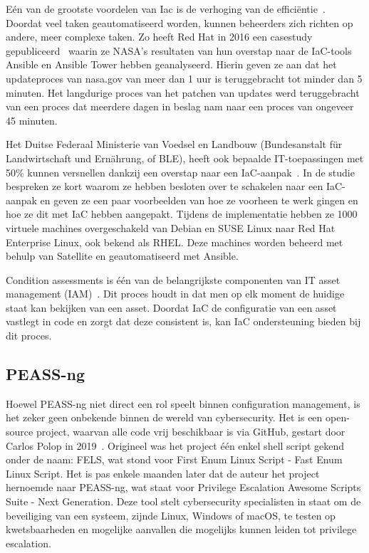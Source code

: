 E\'en van de grootste voordelen van Iac is de verhoging van de effici\"entie~\autocite{splunk-benefits-iac}.
Doordat veel taken geautomatiseerd worden, kunnen beheerders zich richten op andere, meer complexe taken.
Zo heeft Red Hat in 2016 een casestudy gepubliceerd~\autocite{case-study-nasa-iac} waarin ze NASA's resultaten van hun overstap naar de IaC-tools Ansible en Ansible Tower hebben geanalyseerd.
Hierin geven ze aan dat het updateproces van nasa.gov van meer dan 1 uur is teruggebracht tot minder dan 5 minuten.
Het langdurige proces van het patchen van updates werd teruggebracht van een proces dat meerdere dagen in beslag nam naar een proces van ongeveer 45 minuten.

Het Duitse Federaal Ministerie van Voedsel en Landbouw (Bundesanstalt f\"ur Landwirtschaft und Ern\"ahrung, of BLE), heeft ook bepaalde IT-toepassingen met 50\% kunnen versnellen dankzij een overstap naar een IaC-aanpak~\autocite{case-study-ble-iac}.
In de studie bespreken ze kort waarom ze hebben besloten over te schakelen naar een IaC-aanpak en geven ze een paar voorbeelden van hoe ze voorheen te werk gingen en hoe ze dit met IaC hebben aangepakt.
Tijdens de implementatie hebben ze 1000 virtuele machines overgeschakeld van Debian en SUSE Linux naar Red Hat Enterprise Linux, ook bekend als RHEL.
Deze machines worden beheerd met behulp van Satellite en geautomatiseerd met Ansible.

Condition assessments is één van de belangrijkste componenten van IT asset management (IAM)~\autocite{ibm-what-is-iam}.
Dit proces houdt in dat men op elk moment de huidige staat kan bekijken van een asset.
Doordat IaC de configuratie van een asset vastlegt in code en zorgt dat deze consistent is, kan IaC ondersteuning bieden bij dit proces.

\subsection{PEASS-ng}
\label{sub:peass-ng}

Hoewel PEASS-ng niet direct een rol speelt binnen configuration management, is het zeker geen onbekende binnen de wereld van cybersecurity.
Het is een open-source project, waarvan alle code vrij beschikbaar is via GitHub, gestart door Carlos Polop in 2019~\autocite{peass-ng-github}.
Origineel was het project \'e\'en enkel shell script gekend onder de naam: FELS, wat stond voor First Enum Linux Script - Fast Enum Linux Script.
Het is pas enkele maanden later dat de auteur het project hernoemde naar PEASS-ng, wat staat voor Privilege Escalation Awesome Scripts Suite - Next Generation.
Deze tool stelt cybersecurity specialisten in staat om de beveiliging van een systeem, zijnde Linux, Windows of macOS, te testen op kwetsbaarheden en mogelijke aanvallen die mogelijks kunnen leiden tot privilege escalation.

